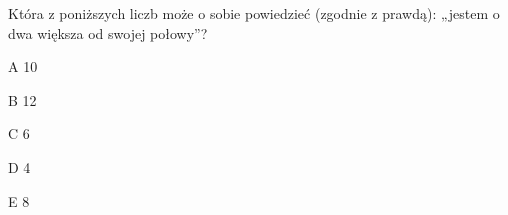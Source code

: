 \begin{tresc}
Która z poniższych liczb może o sobie powiedzieć (zgodnie z prawdą): „jestem o dwa większa od swojej połowy”?
\end{tresc}
\begin{wariant}{A} 10 \end{wariant}
\begin{wariant}{B} 12 \end{wariant}
\begin{wariant}{C} 6 \end{wariant}
\begin{wariant}{D} 4 \end{wariant}
\begin{wariant}{E} 8 \end{wariant}
